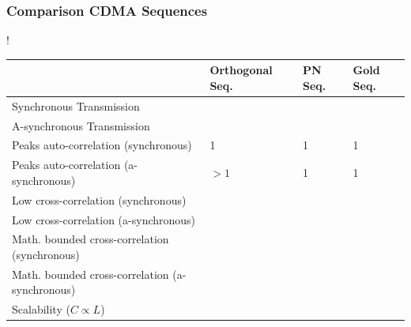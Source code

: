 \documentclass{beamer}
\newcommand{\cmark}{\ding{51}}%
\newcommand{\xmark}{\ding{55}}%
\begin{document}
	\begin{frame}\frametitle{Comparison CDMA Sequences}
		



		\begin{table}
			\centering
			\resizebox {\textwidth} {!} {
				\begin{tabular}{ | l | l | l | l | }

					\hline
															& Orthogonal Seq. 			& PN Seq.						& Gold Seq.				\\ \hline
			Synchronous	Transmission						& \cmark					& \cmark						& \cmark				\\ \hline
			A-synchronous Transmission						& \xmark					& \cmark						& \cmark				\\ \hline
			Peaks auto-correlation (synchronous)			& 1							& 1								& 1						\\ \hline
			Peaks auto-correlation (a-synchronous)			& $> 1$						& 1								& 1						\\ \hline
			Low cross-correlation (synchronous)				& \cmark					& \cmark						& \cmark				\\ \hline
			Low cross-correlation (a-synchronous)			& \xmark					& \cmark						& \cmark				\\ \hline
			Math. bounded cross-correlation (synchronous)	& \cmark					& \xmark						& \cmark				\\ \hline
			Math. bounded cross-correlation (a-synchronous)	& \xmark					& \xmark						& \cmark				\\ \hline
			Scalability ($C \propto L$)						& \cmark					& \xmark						& \cmark				\\ \hline		


				\end{tabular}
			}

		\end{table}
	\end{frame}
\end{document}
